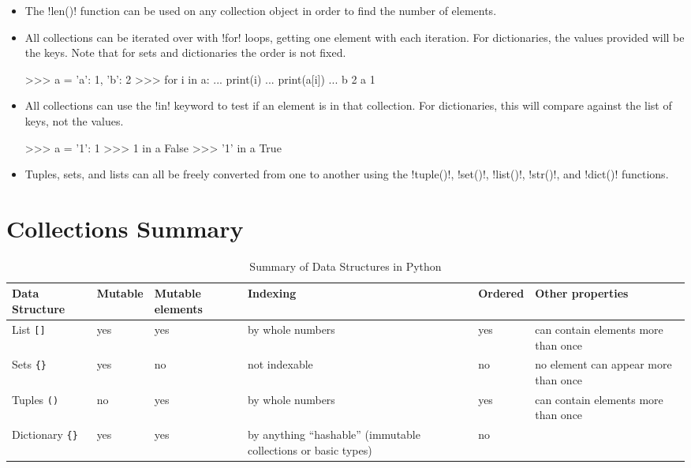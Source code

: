 \documentclass[11pt]{cselabheader}
\begin{document}
\begin{itemize}
\item The \pythoninline!len()! function can be used on any collection object
  in order to find the number of elements.
\item All collections can be iterated over with \pythoninline!for! loops,
  getting one element with each iteration. For dictionaries, the values provided
  will be the keys. Note that for sets and dictionaries the order is not fixed.

  \begin{pyconcode}
>>> a = {'a': 1, 'b': 2}
>>> for i in a:
...     print(i)
...     print(a[i])
... 
b
2
a
1
  \end{pyconcode}

\item All collections can use the \pythoninline!in! keyword to test
  if an element is in that collection. For dictionaries, this will
  compare against the list of keys, not the values.
  \begin{pyconcode}
>>> a = {'1': 1}
>>> 1 in a
False
>>> '1' in a
True
  \end{pyconcode}
\item Tuples, sets, and lists can all be freely converted from one
  to another using the \pythoninline!tuple()!, \pythoninline!set()!,
  \pythoninline!list()!, \pythoninline!str()!, and \pythoninline!dict()! functions.
\end{itemize}

\pagebreak
\section{Collections Summary}

\begin{table}[!ht]
  \centering
  \begin{tabular}{p{1.6cm}lp{1.6cm}p{3.5cm}lp{4.5cm}}
    \toprule
    Data Structure & Mutable & Mutable elements & Indexing & Ordered
    & Other
    properties\\
    \midrule
    List \lstinline![]! & yes & yes & by whole numbers & yes & can contain elements more than once\\
    Sets \lstinline!{}! & yes & no & not indexable & no & no element can appear more than once\\
    Tuples \lstinline!()! & no & yes & by whole numbers & yes & can contain elements more than
    once\\
    Dictionary \lstinline!{}! & yes & yes & by anything ``hashable'' (immutable collections or
    basic types) & no & \\
    \bottomrule
  \end{tabular}
  \caption{Summary of Data Structures in Python}
  \label{tab:sum}
\end{table}
\end{document}

